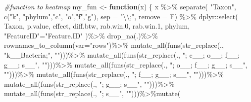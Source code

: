 \documentclass[]{interact}
\theoremstyle{plain}%
\theoremstyle{definition}
\theoremstyle{remark}
\newenvironment{Shaded}{\begin{snugshade}}{\end{snugshade}}
\newcommand{\AttributeTok}[1]{\textcolor[rgb]{0.77,0.63,0.00}{#1}}
\newcommand{\CommentTok}[1]{\textcolor[rgb]{0.56,0.35,0.01}{\textit{#1}}}
\newcommand{\ControlFlowTok}[1]{\textcolor[rgb]{0.13,0.29,0.53}{\textbf{#1}}}
\newcommand{\FloatTok}[1]{\textcolor[rgb]{0.00,0.00,0.81}{#1}}
\newcommand{\FunctionTok}[1]{\textcolor[rgb]{0.00,0.00,0.00}{#1}}
\newcommand{\NormalTok}[1]{#1}
\newcommand{\OtherTok}[1]{\textcolor[rgb]{0.56,0.35,0.01}{#1}}
\newcommand{\SpecialCharTok}[1]{\textcolor[rgb]{0.00,0.00,0.00}{#1}}
\newcommand{\StringTok}[1]{\textcolor[rgb]{0.31,0.60,0.02}{#1}}
\begin{document}
\begin{Shaded}
\begin{Highlighting}[]
\CommentTok{\#function to heatmap}
\NormalTok{my\_fun }\OtherTok{\textless{}{-}} \ControlFlowTok{function}\NormalTok{(x) \{ }
\NormalTok{  x }\SpecialCharTok{\%\textgreater{}\%} \FunctionTok{separate}\NormalTok{(}
    \StringTok{"Taxon"}\NormalTok{, }\FunctionTok{c}\NormalTok{(}\StringTok{"k"}\NormalTok{, }\StringTok{"phylum"}\NormalTok{,}\StringTok{"c"}\NormalTok{, }\StringTok{"o"}\NormalTok{,}\StringTok{"f"}\NormalTok{,}\StringTok{"g"}\NormalTok{),}
    \AttributeTok{sep =} \StringTok{"}\SpecialCharTok{\textbackslash{}\textbackslash{}}\StringTok{;"}\NormalTok{, }\AttributeTok{remove =}\NormalTok{ F) }\SpecialCharTok{\%\textgreater{}\%}\NormalTok{ dplyr}\SpecialCharTok{::}\FunctionTok{select}\NormalTok{(}
\NormalTok{      Taxon, p.value, effect, diff.btw, rab.win}\FloatTok{.0}\NormalTok{, rab.win}\FloatTok{.1}\NormalTok{, phylum, }
      \StringTok{"FeatureID"}\OtherTok{=}\StringTok{"Feature.ID"}\NormalTok{ )}\SpecialCharTok{\%\textgreater{}\%} 
    \FunctionTok{drop\_na}\NormalTok{(.)}\SpecialCharTok{\%\textgreater{}\%} 
    \FunctionTok{rownames\_to\_column}\NormalTok{(}\AttributeTok{var=}\StringTok{"rows"}\NormalTok{)}\SpecialCharTok{\%\textgreater{}\%}       
    \FunctionTok{mutate\_all}\NormalTok{(}\FunctionTok{funs}\NormalTok{(}\FunctionTok{str\_replace}\NormalTok{(., }\StringTok{"k\_\_Bacteria;"}\NormalTok{, }\StringTok{""}\NormalTok{)))}\SpecialCharTok{\%\textgreater{}\%}
    \FunctionTok{mutate\_all}\NormalTok{(}\FunctionTok{funs}\NormalTok{(}\FunctionTok{str\_replace}\NormalTok{(., }\StringTok{"; c\_\_; o\_\_; f\_\_; g\_\_; s\_\_"}\NormalTok{, }\StringTok{""}\NormalTok{)))}\SpecialCharTok{\%\textgreater{}\%} 
    \FunctionTok{mutate\_all}\NormalTok{(}\FunctionTok{funs}\NormalTok{(}\FunctionTok{str\_replace}\NormalTok{(., }\StringTok{"; o\_\_; f\_\_; g\_\_; s\_\_"}\NormalTok{, }\StringTok{""}\NormalTok{)))}\SpecialCharTok{\%\textgreater{}\%} 
    \FunctionTok{mutate\_all}\NormalTok{(}\FunctionTok{funs}\NormalTok{(}\FunctionTok{str\_replace}\NormalTok{(., }\StringTok{"; f\_\_; g\_\_; s\_\_"}\NormalTok{, }\StringTok{""}\NormalTok{)))}\SpecialCharTok{\%\textgreater{}\%}
    \FunctionTok{mutate\_all}\NormalTok{(}\FunctionTok{funs}\NormalTok{(}\FunctionTok{str\_replace}\NormalTok{(., }\StringTok{"; g\_\_; s\_\_"}\NormalTok{, }\StringTok{""}\NormalTok{)))}\SpecialCharTok{\%\textgreater{}\%}
    \FunctionTok{mutate\_all}\NormalTok{(}\FunctionTok{funs}\NormalTok{(}\FunctionTok{str\_replace}\NormalTok{(., }\StringTok{"; s\_\_"}\NormalTok{, }\StringTok{""}\NormalTok{)))}\SpecialCharTok{\%\textgreater{}\%}\FunctionTok{mutate}\NormalTok{(}

\end{Highlighting}
\end{Shaded}
\end{document}
